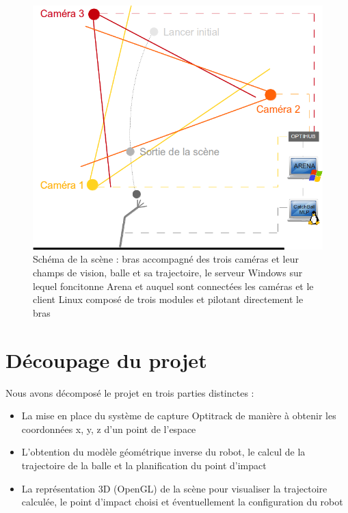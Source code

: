 \documentclass{article}[11pt]
\begin{document}
\begin{figure}[!htc]
	\begin{center}
		\includegraphics[scale=0.5]{images/general.png}
		\caption{Schéma de la scène : bras accompagné des trois caméras et leur champs de vision, balle et sa trajectoire, le serveur Windows sur lequel foncitonne Arena et auquel sont connectées les caméras et le client Linux composé de trois modules et pilotant directement le bras}
		\label{general}
	\end{center}
\end{figure}

\section{Découpage du projet}

Nous avons décomposé le projet en trois parties distinctes :
\begin{itemize}
\item La mise en place du système de capture Optitrack de manière à obtenir les coordonnées x, y, z d'un point de l'espace
\item L'obtention du modèle géométrique inverse du robot, le calcul de la trajectoire de la balle et la planification du point d'impact
\item La représentation 3D (OpenGL) de la scène pour visualiser la trajectoire calculée, le point d'impact choisi et éventuellement la configuration du robot \\
\end{itemize}
\end{document}
